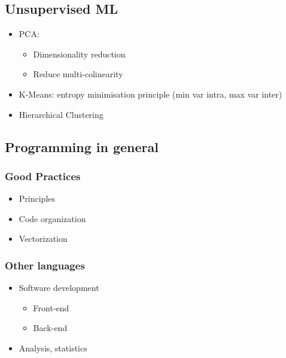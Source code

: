 \subsection{Unsupervised ML}

\begin{itemize}
   \item PCA:
   \begin{itemize}
      \item Dimensionality reduction
      \item Reduce multi-colinearity
   \end{itemize}
   \item K-Means: entropy minimisation principle (min var intra, max var inter)
   \item Hierarchical Clustering
\end{itemize}


\subsection{Programming in general}

\subsubsection{Good Practices}

\begin{itemize}
   \item Principles
   \item Code organization
   \item Vectorization
\end{itemize}


\subsubsection{Other languages}

\begin{itemize}
   \item Software development
   \begin{itemize}
      \item Front-end
      \item Back-end
   \end{itemize}
   \item Analysis, statistics
\end{itemize}





